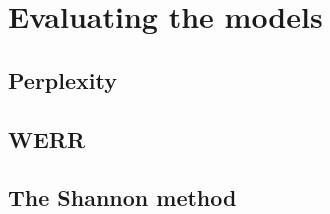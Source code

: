 \chapter{Evaluating the models}
\label{chapter:results}
\section{Perplexity}
\section{WERR}
\section{The Shannon method}
